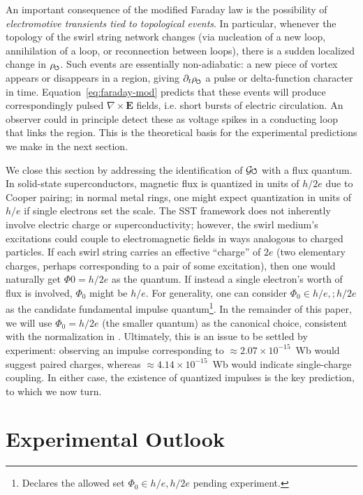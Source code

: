 \documentclass[12pt]{article}
\DeclareRobustCommand{\swirlarrow}{
\mathchoice{\mkern-2mu\scriptstyle\boldsymbol{\circlearrowleft}}%
{\mkern-2mu\scriptstyle\boldsymbol{\circlearrowleft}}%
{\mkern-2mu\scriptscriptstyle\boldsymbol{\circlearrowleft}}%
{\mkern-2mu\scriptscriptstyle\boldsymbol{\circlearrowleft}}
}%
\newcommand{\Gswirl}{\mathcal{G}\swirlarrow}
\begin{document}
An important consequence of the modified Faraday law is the possibility of \emph{electromotive transients tied to topological events}. In particular, whenever the topology of the swirl string network changes (via nucleation of a new loop, annihilation of a loop, or reconnection between loops), there is a sudden localized change in $\rho_{\swirlarrow}$. Such events are essentially non-adiabatic: a new piece of vortex appears or disappears in a region, giving $\partial_t \rho_{\swirlarrow}$ a pulse or delta-function character in time. Equation~\eqref{eq:faraday-mod} predicts that these events will produce correspondingly pulsed $\nabla \times \mathbf{E}$ fields, i.e. short bursts of electric circulation. An observer could in principle detect these as voltage spikes in a conducting loop that links the region. This is the theoretical basis for the experimental predictions we make in the next section.


We close this section by addressing the identification of $\Gswirl$ with a flux quantum. In solid-state superconductors, magnetic flux is quantized in units of $h/2e$ due to Cooper pairing; in normal metal rings, one might expect quantization in units of $h/e$ if single electrons set the scale. The SST framework does not inherently involve electric charge or superconductivity; however, the swirl medium's excitations could couple to electromagnetic fields in ways analogous to charged particles. If each swirl string carries an effective ``charge'' of $2e$ (two elementary charges, perhaps corresponding to a pair of some excitation), then one would naturally get $\Phi{0}=h/2e$ as the quantum. If instead a single electron's worth of flux is involved, $\Phi_{0}$ might be $h/e$. For generality, one can consider $\Phi_{0}\in{h/e,;h/2e}$ as the candidate fundamental impulse quantum\footnote{Declares the allowed set $\Phi_0\in{h/e,h/2e}$ pending experiment.}. In the remainder of this paper, we will use $\Phi_{0}=h/2e$ (the smaller quantum) as the canonical choice, consistent with the normalization in \cite{Iskandarani2025RotatingFrame,Iskandarani2025FluxComp}. Ultimately, this is an issue to be settled by experiment: observing an impulse corresponding to $\approx2.07\times10^{-15}$~Wb would suggest paired charges, whereas $\approx4.14\times10^{-15}$~Wb would indicate single-charge coupling. In either case, the existence of quantized impulses is the key prediction, to which we now turn.


\section{Experimental Outlook}\label{sec:experimental}
\end{document}

